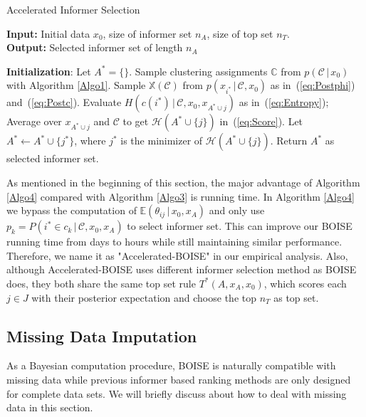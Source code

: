 \documentclass[12pt]{article}
\begin{document}
\begin{algorithm}
\caption{Accelerated Informer Selection}\label{Algo4}
\hspace*{\algorithmicindent} \textbf{Input:} Initial data $x_0$, size of informer set $n_A$, size of top set $n_T$.\\
\hspace*{\algorithmicindent} \textbf{Output:} Selected informer set of length $n_A$
\begin{algorithmic}[1]
\State \textbf{Initialization}: Let $A^* = \{\}$. Sample clustering assignments $\mathbb C$ from $p(\mathcal C\,|\, x_0)$ with Algorithm \ref{Algo1}.
    \State Sample $\mathbb{X}(\mathcal{C})$ from $p\left(x_{i^*}\,|\, \mathcal C,x_0\right)$ as in~(\ref{eq:Postphi}) and~(\ref{eq:Postc}).
\EndFor
{}
            \State Evaluate $H(c(i^*)\,|\,\mathcal{C},x_0,x_{A^*\cup j})$ as in~(\ref{eq:Entropy});
        \EndFor
        \State Average over $x_{A^*\cup j}$ and $\mathcal{C}$ to get $\mathcal H(A^*\cup\{j\} )$ in~(\ref{eq:Score}). 
    \EndFor
    \State Let $A^*\gets A^*\cup \{j^*\}$, where $j^*$ is the minimizer of $\mathcal H(A^*\cup\{j\})$.
\EndWhile
\State Return $A^*$ as selected informer set.
\end{algorithmic}
\end{algorithm}
As mentioned in the beginning of this section, the major advantage of Algorithm \ref{Algo4} compared with Algorithm \ref{Algo3} is running time. In Algorithm \ref{Algo4} we bypass the computation of $\mathbb E\left(\theta_{ij}\,|\, x_0,x_A\right)$ and only use $p_k = P(i^*\in c_k\,|\, \mathcal C,x_0,x_A)$ to select informer set. This can improve our BOISE running time from days to hours while still maintaining similar performance. Therefore, we name it as "Accelerated-BOISE" in our empirical analysis. Also, although Accelerated-BOISE uses different informer selection method as BOISE does, they both share the same top set rule $T^*(A,x_A,x_0)$, which scores each $j\in J$ with their posterior expectation and choose the top $n_T$ as top set.  

\subsection{Missing Data Imputation}
As a Bayesian computation procedure, BOISE is naturally compatible with missing data while previous informer based ranking methods are only designed for complete data sets. We will briefly discuss about how to deal with missing data in this section. 
\end{document}
